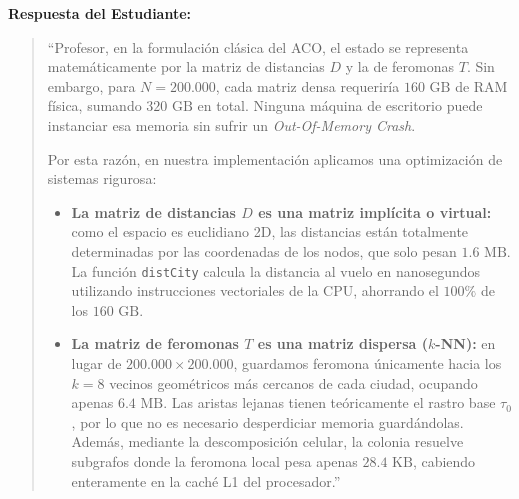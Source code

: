 \documentclass[11pt,a4paper]{article}
\begin{document}
\begin{sustentacionbox}
\textbf{Respuesta del Estudiante:}
\begin{quote}
``Profesor, en la formulación clásica del ACO, el estado se representa matemáticamente por la matriz de distancias $D$ y la de feromonas $T$. Sin embargo, para $N = 200.000$, cada matriz densa requeriría $160\text{ GB}$ de RAM física, sumando $320\text{ GB}$ en total. Ninguna máquina de escritorio puede instanciar esa memoria sin sufrir un \emph{Out-Of-Memory Crash}.

Por esta razón, en nuestra implementación aplicamos una optimización de sistemas rigurosa:
\begin{itemize}
    \item \textbf{La matriz de distancias $D$ es una matriz implícita o virtual:} como el espacio es euclidiano 2D, las distancias están totalmente determinadas por las coordenadas de los nodos, que solo pesan $1.6\text{ MB}$. La función \texttt{distCity} calcula la distancia al vuelo en nanosegundos utilizando instrucciones vectoriales de la CPU, ahorrando el $100\%$ de los $160\text{ GB}$.
    \item \textbf{La matriz de feromonas $T$ es una matriz dispersa ($k$-NN):} en lugar de $200.000 \times 200.000$, guardamos feromona únicamente hacia los $k=8$ vecinos geométricos más cercanos de cada ciudad, ocupando apenas $6.4\text{ MB}$. Las aristas lejanas tienen teóricamente el rastro base $\tau_0$, por lo que no es necesario desperdiciar memoria guardándolas. Además, mediante la descomposición celular, la colonia resuelve subgrafos donde la feromona local pesa apenas $28.4\text{ KB}$, cabiendo enteramente en la caché L1 del procesador.''
\end{itemize}
\end{quote}
\end{sustentacionbox}
\end{document}
